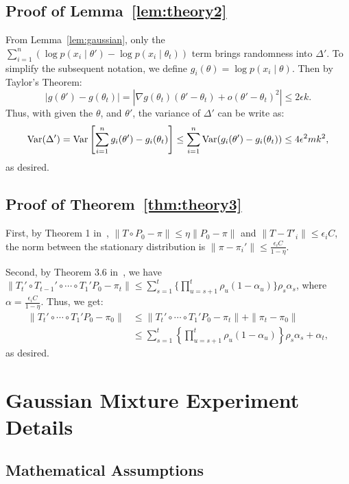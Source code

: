 \documentclass{article}
\begin{document}
\subsection{Proof of Lemma~\ref{lem:theory2}}\label{app:theory2}

From Lemma~\ref{lem:gaussian}, only the $\sum_{i=1}^n (\log p(x_i\mid \theta') - \log p(x_i\mid
\theta_t))$ term brings randomness into $\Delta'$. To simplify the subsequent notation, we define
$g_i(\theta) = \log p(x_i\mid \theta)$. Then by Taylor's Theorem:
\[
|g(\theta') - g(\theta_t)| = |\nabla g(\theta_t) (\theta' - \theta_t) + o(\theta' - \theta_t)^2| \leq 2\epsilon k.
\]
Thus, with given the $\theta$, and $\theta'$, the variance of $\Delta'$ can be write as:
\[
{\rm Var}(\Delta') = {\rm Var}\left[\sum_{i=1}^n g_i(\theta') - g_i(\theta_t)\right] \leq
\sum_{i=1}^n  {\rm Var}(g_i(\theta') - g_i(\theta_t)) \leq  4\epsilon^2 m k^2,
\]
as desired.

\subsection{Proof of Theorem~\ref{thm:theory3}}\label{app:theory3}

First, by Theorem 1 in~\cite{cutting_mh_2014}, $\|T \circ P_0 - \pi\| \leq \eta \|P_0
- \pi\|$ and $\|T-T'_i\| \leq \epsilon_i C$, the norm between the stationary distribution is $\|\pi
- \pi_i'\|\leq \frac{\epsilon_i C}{1-\eta}$.

Second, by Theorem 3.6 in~\cite{yang2013sequential}, we have  $\| T_t' \circ T_{t-1}' \circ \cdots
\circ T_1' P_0 - \pi_t \| \leq \sum_{s=1}^t \{\prod _{u=s+1}^t \rho_u (1-\alpha_u)\} \rho_s
\alpha_s$, where $\alpha = \frac{\epsilon_i C}{1-\eta}$. Thus, we get:
\begin{align*}
 \| T_t' \circ \cdots \circ T_1' P_0 - \pi_0 \| &\leq \|T_t' \circ \cdots \circ T_1' P_0 - \pi_t\| + \|\pi_t - \pi_0\| \\
 &\leq \sum_{s=1}^t \left\{\prod _{u=s+1}^t \rho_u (1-\alpha_u)\right\} \rho_s \alpha_s + \alpha_t,
\end{align*}
as desired.




\section{Gaussian Mixture Experiment Details}\label{app:gaussian}

\subsection{Mathematical Assumptions}
\end{document}
